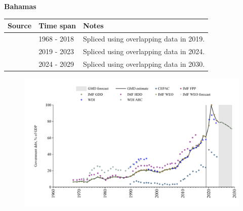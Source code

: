\documentclass[12pt,a4paper,landscape]{article}
\begin{document}
\begin{adjustbox}{max totalsize={\paperwidth}{\paperheight},center}
\begin{minipage}[t][\textheight][t]{\textwidth}
\vspace*{0.5cm}
{}
\begin{center}
{\Large\bfseries Bahamas}
\end{center}
\vspace{0.5cm}
\begin{table}[H]
\centering
\small
\begin{tabular}{|l|l|l|}
\hline
\textbf{Source} & \textbf{Time span} & \textbf{Notes} \\
\hline
\rowcolor{white}\cite{IMF_GDD}& 1968 - 2018 &Spliced using overlapping data in 2019.\\
\rowcolor{lightgray}\cite{IMF_FPP}& 2019 - 2023 &Spliced using overlapping data in 2024.\\
\rowcolor{white}\cite{IMF_WEO_forecast}& 2024 - 2029 &Spliced using overlapping data in 2030.\\
\hline
\end{tabular}
\end{table}
\begin{figure}[H]
\centering
\includegraphics[width=\textwidth,height=0.6\textheight,keepaspectratio]{graphs/BHS_govdebt_GDP.pdf}
\end{figure}
\end{minipage}
\end{adjustbox}
\end{document}
